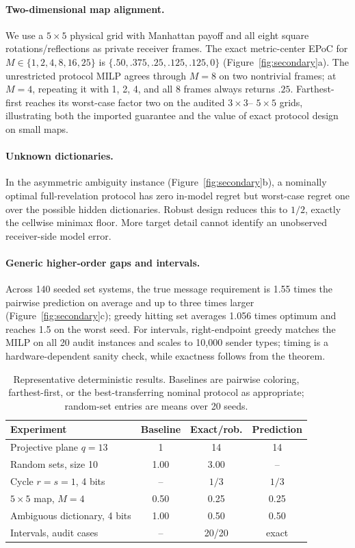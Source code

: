 \documentclass[letterpaper]{article} %
\begin{document}
\paragraph{Two-dimensional map alignment.}
We use a $5\times5$ physical grid with Manhattan payoff and all eight square
rotations/reflections as private receiver frames. The exact metric-center EPoC
for $M\in\{1,2,4,8,16,25\}$ is
$\{.50,.375,.25,.125,.125,0\}$ (Figure~\ref{fig:secondary}a).
The unrestricted protocol MILP agrees through $M=8$ on two nontrivial frames;
at $M=4$, repeating it with 1, 2, 4, and all 8 frames always returns $.25$.
Farthest-first reaches its worst-case factor two on the audited $3\times3$--
$5\times5$ grids, illustrating both the imported guarantee and the value of
exact protocol design on small maps.

\paragraph{Unknown dictionaries.}
In the asymmetric ambiguity instance (Figure~\ref{fig:secondary}b), a nominally
optimal full-revelation protocol has zero in-model regret but worst-case regret
one over the possible hidden dictionaries. Robust design reduces this to
$1/2$, exactly the cellwise minimax floor. More target detail cannot identify
an unobserved receiver-side model error.

\paragraph{Generic higher-order gaps and intervals.}
Across 140 seeded set systems, the true message requirement is 1.55 times the
pairwise prediction on average and up to three times larger
(Figure~\ref{fig:secondary}c); greedy hitting set averages 1.056 times optimum
and reaches 1.5 on the worst seed. For intervals, right-endpoint greedy matches
the MILP on all 20 audit instances and scales to 10,000 sender types; timing is
a hardware-dependent sanity check, while exactness follows from the theorem.

\begin{table}[t]
\centering
\scriptsize
\setlength{\tabcolsep}{2.0pt}
\begin{tabular}{p{}ccc}
\toprule
Experiment & Baseline & Exact/rob. & Prediction \\
\midrule
Projective plane $q=13$ & 1 & 14 & 14 \\
Random sets, size 10 & 1.00 & 3.00 & -- \\
Cycle $r=s=1$, 4 bits & -- & $1/3$ & $1/3$ \\
$5\times5$ map, $M=4$ & 0.50 & 0.25 & 0.25 \\
Ambiguous dictionary, 4 bits & 1.00 & 0.50 & 0.50 \\
Intervals, audit cases & -- & 20/20 & exact \\
\bottomrule
\end{tabular}
\caption{Representative deterministic results. Baselines are pairwise coloring,
farthest-first, or the best-transferring nominal protocol as appropriate;
random-set entries are means over 20 seeds.}
\label{tab:results}
\end{table}
\end{document}
